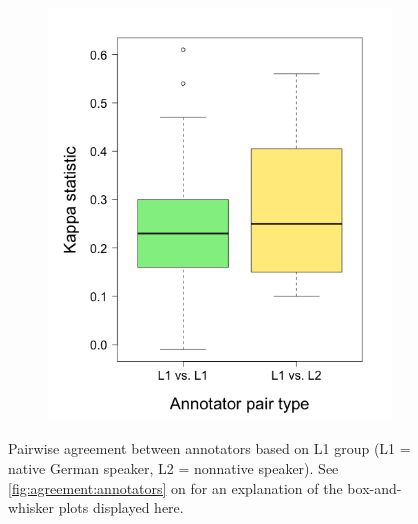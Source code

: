 \begin{figure}[h!]
\begin{subfigure}{.5\textwidth}
				\includegraphics[width=\textwidth]{img/plots/pairwiseKappaByL1-noTitle}
				\label{fig:agreement:L1:k}
			\end{subfigure}%
			
			\caption[Pairwise agreement statistics by annotator L1 group]{ Pairwise agreement between annotators based on L1 group (L1 = native German speaker, L2 = nonnative speaker). 
			See \cref{fig:agreement:annotators} on  for an explanation of the box-and-whisker plots displayed here.
			}
			\label{fig:agreement:L1}
		\end{figure}
		
